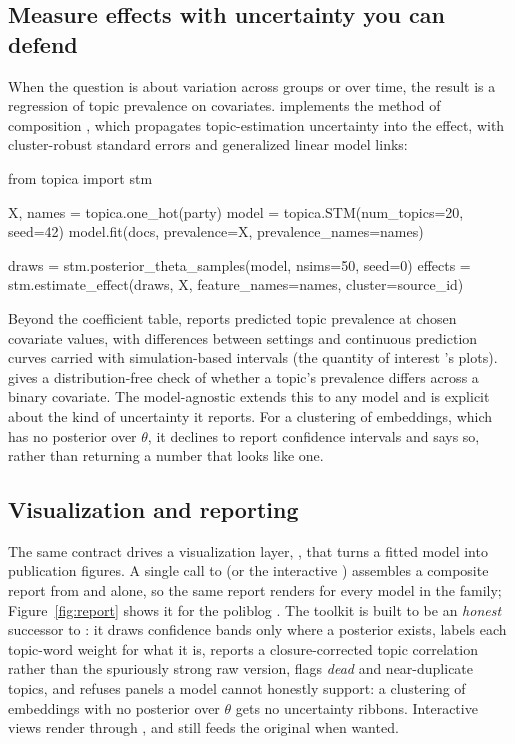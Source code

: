 \documentclass[article,nojss]{jss}
\begin{document}
\subsection{Measure effects with uncertainty you can defend}

When the question is about variation across groups or over time, the result is a
regression of topic prevalence on covariates.  implements the method
of composition \citep{roberts2016model}, which propagates topic-estimation
uncertainty into the effect, with cluster-robust standard errors and generalized
linear model links:

\begin{CodeChunk}
\begin{CodeInput}
from topica import stm

X, names = topica.one_hot(party)
model = topica.STM(num_topics=20, seed=42)
model.fit(docs, prevalence=X, prevalence_names=names)

draws   = stm.posterior_theta_samples(model, nsims=50, seed=0)
effects = stm.estimate_effect(draws, X, feature_names=names, cluster=source_id)
\end{CodeInput}
\end{CodeChunk}

Beyond the coefficient table,  reports predicted
topic prevalence at chosen covariate values, with differences between settings and
continuous prediction curves carried with simulation-based intervals (the
quantity of interest 's  plots).
 gives a distribution-free check of whether a
topic's prevalence differs across a binary covariate. The model-agnostic
 extends this to any model and is explicit about the
kind of uncertainty it reports. For a clustering of embeddings, which has no
posterior over $\theta$, it declines to report confidence intervals and says so,
rather than returning a number that looks like one.

\subsection{Visualization and reporting}

The same contract drives a visualization layer, , that turns a
fitted model into publication figures. A single call to 
(or the interactive ) assembles a composite report from
 and  alone, so the same report renders for
every model in the family; Figure~\ref{fig:report} shows it for the poliblog
. The toolkit is built to be an \emph{honest} successor to 
\citep{sievert2014ldavis}: it draws confidence bands only where a posterior
exists, labels each topic-word weight for what it is, reports a closure-corrected
topic correlation rather than the spuriously strong raw version, flags \emph{dead}
and near-duplicate topics, and refuses panels a model cannot honestly support: a
clustering of embeddings with no posterior over $\theta$ gets no uncertainty
ribbons. Interactive views render through , and
 still feeds the original  when wanted.
\end{document}
